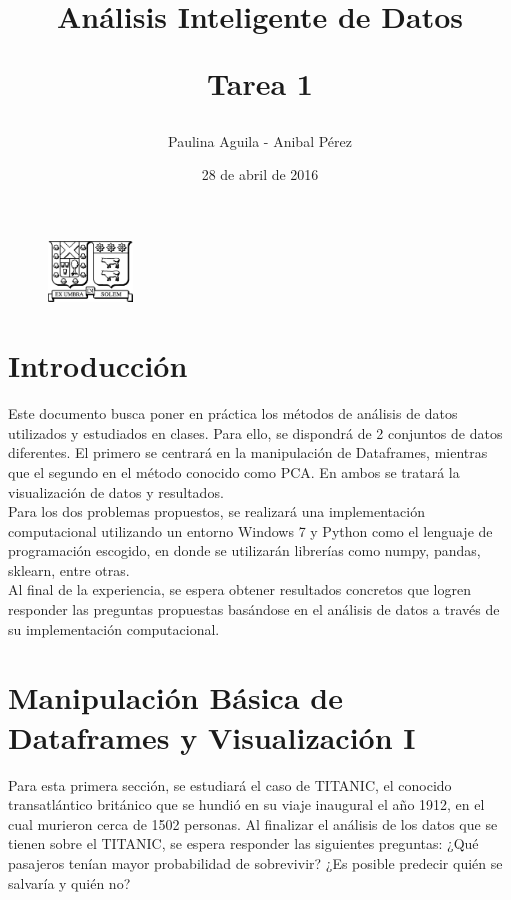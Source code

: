 \documentclass[letter, 10pt]{article}
\begin{document}
\title{Análisis Inteligente de Datos \\ \begin{Large}Tarea 1\end{Large}}
\author{Paulina Aguila - Anibal Pérez}
\date{28 de abril de 2016}

\maketitle


\begin{figure}[ht]
\begin{center}
\includegraphics[width=0.2\textwidth]{Images/Isotipo-Negro.png}\\
\end{center}
\end{figure}
\vspace{2cm}
\section{Introducci\'on}
Este documento busca poner en práctica los métodos de análisis de datos utilizados y estudiados en clases. Para ello, se dispondrá de 2 conjuntos de datos diferentes. El primero se centrará en la manipulación de Dataframes, mientras que el segundo en el método conocido como PCA. En ambos se tratará la visualización de datos y resultados.\\

Para los dos problemas propuestos, se realizará una implementación computacional utilizando un entorno Windows 7 y Python como el lenguaje de programación escogido, en donde se utilizarán librerías como numpy, pandas, sklearn, entre otras.\\

Al final de la experiencia, se espera obtener resultados concretos que logren responder las preguntas propuestas basándose en el análisis de datos a través de su implementación computacional.

\section{Manipulación Básica de Dataframes y Visualización I}

Para esta primera sección, se estudiará el caso de TITANIC, el conocido transatlántico británico que se hundió en su viaje inaugural el año 1912, en el cual murieron cerca de 1502 personas. Al finalizar el análisis de los datos que se tienen sobre el TITANIC, se espera responder las siguientes preguntas: ¿Qué pasajeros tenían mayor probabilidad de sobrevivir? ¿Es posible predecir quién se salvaría y quién no?
\end{document}
